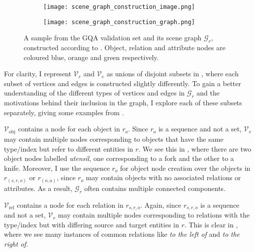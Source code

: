 \begin{figure}[htbp]
    \centering
    \begin{subfigure}[l]{0.49\textwidth}
        \texttt{[image: scene\_graph\_construction\_image.png]}
        \label{fig:scene_graph_construction_image}
    \end{subfigure}
    \begin{subfigure}[r]{0.49\textwidth}
        \texttt{[image: scene\_graph\_construction\_graph.png]}
        \label{fig:scene_graph_construction_graph}
    \end{subfigure}
    \caption[An image from the GQA dataset and its corresponding scene graph \(\mathcal{G}_r\).]{A sample from the GQA validation set and its scene graph \(\mathcal{G}_r\), constructed according to \algorithmcfname{ \ref{algorithm:scene_graph_construction}}. Object, relation and attribute nodes are coloured blue, orange and green respectively.}
    \label{fig:scene_graph_construction}
\end{figure}

For clarity, I represent \(\mathcal{V}_r\) and \(\mathcal{V}_e\) as unions of disjoint subsets in \algorithmcfname{ \ref{algorithm:scene_graph_construction}}, where each subset of vertices and edges is constructed slightly differently. To gain a better understanding of the different types of vertices and edges in \(\mathcal{G}_r\) and the motivations behind their inclusion in the graph, I explore each of these subsets separately, giving some examples from \figureautorefname{ \ref{fig:scene_graph_construction}}.

\(\mathcal{V}_\text{obj}\) contains a node for each object in \(r_o\). Since \(r_o\) is a sequence and not a set, \(\mathcal{V}_v\) may contain multiple nodes corresponding to objects that have the same type/index but refer to different entities in \(r\). We see this in \figureautorefname{ \ref{fig:scene_graph_construction}}, where there are two object nodes labelled \textit{utensil}, one corresponding to a fork and the other to a knife. Moreover, I use the sequence \(r_o\) for object node creation over the objects in \(r_{(s, r, o)}\) or \(r_{(o, a)}\), since \(r_o\) may contain objects with no associated relations or attributes. As a result, \(\mathcal{G}_r\) often contains multiple connected components.

\(\mathcal{V}_\text{rel}\) contains a node for each relation in \(r_{s, r, o}\). Again, since \(r_{s, r, o}\) is a sequence and not a set, \(\mathcal{V}_v\) may contain multiple nodes corresponding to relations with the type/index but with differing source and target entities in \(r\). This is clear in \figureautorefname{ \ref{fig:scene_graph_construction}}, where we see many instances of common relations like \textit{to the left of} and \textit{to the right of}.

